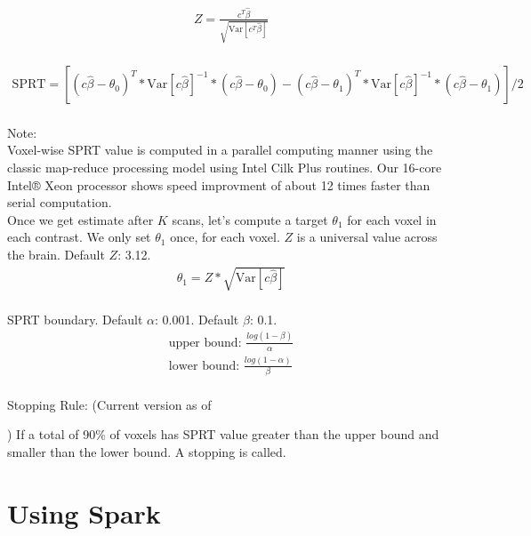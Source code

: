 \documentclass{article}
\newcommand{\Var}{\mathrm{Var}}
\begin{document}
\begin{equation*}
    \label{Z}
    \begin{aligned}
    Z = \frac{c^T\hat{\beta}}{\sqrt{\Var[c^T\hat{\beta}]}}  
    \end{aligned}
\end{equation*}\\


\begin{equation*}
    \label{SPRT}
    \begin{aligned}
    \text{SPRT} = [(c\hat{\beta}-\theta_0)^T * \Var[c\hat{\beta}]^{-1} * (c\hat{\beta}-\theta_0) - (c\hat{\beta}-\theta_1)^T * \Var[c\hat{\beta}]^{-1} * (c\hat{\beta}-\theta_1)] / 2
    \end{aligned}
\end{equation*}\\

\noindent Note:\\
Voxel-wise SPRT value is computed in a parallel computing manner using the classic map-reduce processing model using Intel Cilk Plus routines. Our 16-core Intel® Xeon processor shows speed improvment of about 12 times faster than serial computation.\\
Once we get estimate after $K$ scans, let's compute a target $\theta_1$ for each voxel in each contrast. We only set $\theta_1$ once, for each voxel. $Z$ is a universal value across the brain. Default $Z$: 3.12.
\begin{equation*}
    \label{theta_1}
    \begin{aligned}
    \theta_1 = Z * \sqrt{\Var[c\hat{\beta}]}
    \end{aligned}
\end{equation*}\\
SPRT boundary. Default $\alpha$: 0.001. Default $\beta$: 0.1.
\begin{equation*}
    \label{boundary}
    \begin{aligned}
    \text{upper bound: } \frac{log(1-\beta)}{\alpha} \\
    \text{lower bound: } \frac{log(1-\alpha)}{\beta}
    \end{aligned}
\end{equation*}\\

Stopping Rule: (Current version as of \date{\today})
If a total of 90\% of voxels has SPRT value greater than the upper bound and smaller than the lower bound. A stopping is called.

\section{Using Spark}
\end{document}
